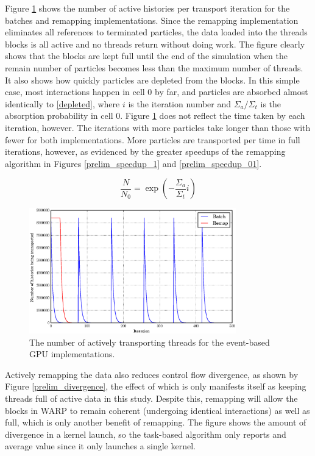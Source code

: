 Figure \ref{prelim_active} shows the number of active histories per transport iteration for the batches and remapping implementations.  Since the remapping implementation eliminates all references to terminated particles, the data loaded into the threads blocks is all active and no threads return without doing work.  The figure clearly shows that the blocks are kept full until the end of the simulation when the remain number of particles becomes less than the maximum number of threads.  It also shows how quickly particles are depleted from the blocks.  In this simple case, most interactions happen in cell 0 by far, and particles are absorbed almost identically to \eqref{depleted}, where $i$ is the iteration number and $\Sigma_a/\Sigma_t$ is the absorption probability in cell 0.   Figure \ref{prelim_active} does not reflect the time taken by each iteration, however.  The iterations with more particles take longer than those with fewer for both implementations.  More particles are transported per time in full iterations, however, as evidenced by the greater speedups of the remapping algorithm in Figures \ref{prelim_speedup_1} and \ref{prelim_speedup_01}.

\begin{equation}
\label{depleted}
\frac{N}{N_0}=\exp \left(-\frac{\Sigma_a}{\Sigma_t} i \right)
\end{equation}

\begin{figure}[h!] 
  \centering
    \includegraphics[width=0.8\textwidth]{graphics/prelim_active.eps}
     \caption{The number of actively transporting threads for the event-based GPU implementations. \label{prelim_active} }
\end{figure}

Actively remapping the data also reduces control flow divergence, as shown by Figure \ref{prelim_divergence}, the effect of which is only manifests itself as keeping threads full of active data in this study.  Despite this, remapping will allow the blocks in WARP to remain coherent (undergoing identical interactions) as well as full, which is only another benefit of remapping.  The figure shows the amount of divergence in a kernel launch, so the task-based algorithm only reports and average value since it only launches a single kernel.

